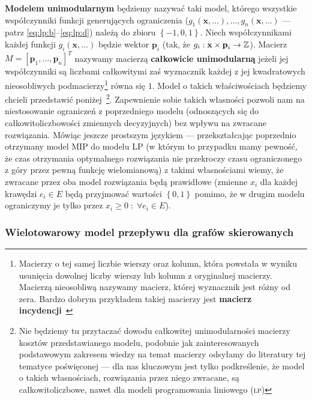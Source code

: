 \textbf{Modelem unimodularnym} będziemy nazywać taki model, którego wszystkie współczynniki funkcji generujących ograniczenia ($g_{1} \left( \textbf{x}, \dots \right), \dots, g_{n} \left( \textbf{x}, \dots \right)$ --- patrz \ref{eq:lp:b}--\ref{eq:lp:d}) należą do zbioru $\left\{ -1, 0, 1 \right\}$. Niech współczynnikami każdej funkcji $g_{i} \left( \textbf{x}, \dots \right)$ będzie wektor $\textbf{p}_{i}$ (tak, że $g_{i}: \textbf{x} \times \textbf{p}_{i} \rightarrow \mathbb{Z}$). Macierz $M = \left[ \textbf{p}_{1}, \dots, \textbf{p}_{n} \right]^{T}$ nazywamy macierzą \textbf{całkowicie unimodularną} jeżeli jej współczynniki są liczbami całkowitymi zaś wyznacznik każdej z jej kwadratowych nieosobliwych podmacierzy\footnote{Macierzy o tej samej liczbie wierszy oraz kolumn, która powstała w wyniku usunięcia dowolnej liczby wierszy lub kolumn z oryginalnej macierzy. Macierzą nieosobliwą nazywamy macierz, której wyznacznik jest różny od zera. Bardzo dobrym przykładem takiej macierzy jest \textbf{macierz incydencji}~\cite[$4$]{Strzalka2015}} równa się $1$. Model o takich właściwościach będziemy chcieli przedstawić poniżej~\cite[$42$--$46$]{Magnanti1995503}\footnote{Nie będziemy tu przytaczać dowodu całkowitej unimodularności macierzy kosztów przedstawianego modelu, podobnie jak zainteresowanych podstawowym zakresem wiedzy na temat macierzy odsyłamy do literatury tej tematyce poświęconej --- dla nas kluczowym jest tylko podkreślenie, że model o takich własnościach, rozwiązania przez niego zwracane, są całkowitoliczbowe, nawet dla modeli programowania liniowego (\textsc{lp})}. Zapewnienie sobie takich własności pozwoli nam na niestosowanie ograniczeń z poprzedniego modelu (odnoszących się do całkowitoliczbowości zmiennych decyzyjnych) bez wpływu na zwracane rozwiązania. Mówiąc jeszcze prostszym językiem --- przekształcając poprzednio otrzymany model \textsc{MIP} do modelu \textsc{LP} (w którym to przypadku mamy pewność, że czas otrzymania optymalnego rozwiązania nie przekroczy czasu ograniczonego z góry przez pewną funkcję wielomianową) z takimi własnościami wiemy, że zwracane przez oba model rozwiązania będą prawidłowe (zmienne $x_{i}$ dla każdej krawędzi $e_{i} \in E$ będą przyjmować wartości $\left\{ 0, 1 \right\}$ pomimo, że w drugim modelu ograniczymy je tylko przez $x_{i} \geqslant 0 \; : \; \forall e_{i} \in E$).

\subsubsection{Wielotowarowy model przepływu dla grafów skierowanych} 

